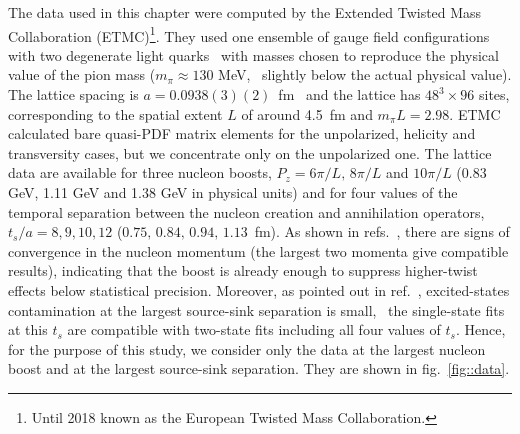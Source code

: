 The data used in this chapter were computed by the Extended Twisted Mass Collaboration
(ETMC)\footnote{Until 2018 known as the European Twisted Mass Collaboration.}.
They used one ensemble of gauge field configurations with two degenerate light
quarks~\cite{Abdel-Rehim:2015pwa} with masses chosen to reproduce the physical
value of the pion mass ($m_\pi\approx130$ MeV, \ie\ slightly below the actual
physical value). The lattice spacing is $a=0.0938(3)(2)$~fm~\cite{Alexandrou:2017xwd} and the lattice has
$48^3 \times 96$ sites, corresponding to the spatial extent $L$ of around 4.5~fm
and $m_\pi L = 2.98$. ETMC calculated bare quasi-PDF matrix elements for the
unpolarized, helicity and transversity cases, but we concentrate only on the
unpolarized one. The lattice data are available for three nucleon boosts,
$P_z=6\pi/L,\,8\pi/L$ and $10\pi/L$ (0.83 GeV, 1.11 GeV and 1.38 GeV in physical
units) and for four values of the temporal separation between the nucleon
creation and annihilation operators, $t_s/a{=}8,9,10,12$ ($0.75,\, 0.84,\,
0.94,\, 1.13$~fm). As shown in refs.~\cite{Alexandrou:2018pbm,Alexandrou:2019lfo}, there are signs
of convergence in the nucleon momentum (the largest two momenta give compatible
results), indicating that the boost is already enough to suppress higher-twist
effects below statistical precision. Moreover, as pointed out in
ref.~\cite{Alexandrou:2019lfo}, excited-states contamination at the largest
source-sink separation is small, \ie\ the single-state fits at this $t_s$ are
compatible with two-state fits including all four values of $t_s$. Hence, for
the purpose of this study, we consider only the data at the largest nucleon
boost and at the largest source-sink separation. 
They are shown in fig.~\ref{fig::data}.

